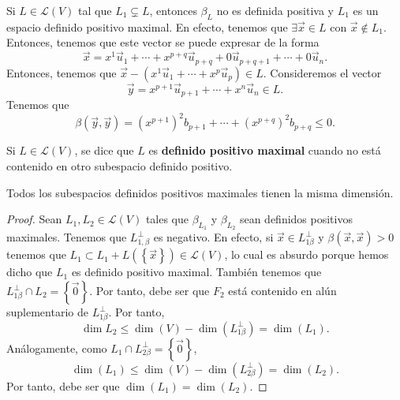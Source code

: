 \begin{observation}
\normalfont Si $\displaystyle L \in \mathcal{L}\left(V\right) $ tal que $\displaystyle L_{1} \subsetneq L $, entonces $\displaystyle \beta_{L} $ no es definida positiva y $\displaystyle L_{1} $ es un espacio definido positivo maximal. En efecto, tenemos que $\displaystyle \exists \vec{x} \in L $ con $\displaystyle \vec{x} \not\in L_{1} $. Entonces, tenemos que este vector se puede expresar de la forma
\[\vec{x} = x^{1}\vec{u}_{1} + \cdots + x^{p + q}\vec{u}_{p + q} + 0 \vec{u}_{p + q +1} + \cdots + 0\vec{u}_{n} .\]
Entonces, tenemos que $\displaystyle \vec{x}-\left(x^{1}\vec{u}_{1} + \cdots + x^{p}\vec{u}_{p}\right) \in L $. Consideremos el vector
\[ \vec{y} = x^{p +1}\vec{u}_{p +1} + \cdots + x^{n}\vec{u}_{n} \in L .\]
Tenemos que 
\[\beta\left(\vec{y},\vec{y}\right) = \left(x^{p + 1}\right)^{2}b_{p + 1} + \cdots + \left(x^{p + q}\right)^{2}b_{p + q} \leq 0 .\]
\end{observation}
\begin{fdefinition}[]
\normalfont Si $\displaystyle L \in \mathcal{L}\left(V\right) $, se dice que $\displaystyle L $ es \textbf{definido positivo maximal} cuando no está contenido en otro subespacio definido positivo.
\end{fdefinition}
\begin{ftheorem}[]
\normalfont Todos los subespacios definidos positivos maximales tienen la misma dimensión.
\end{ftheorem}
\begin{proof}
	Sean $\displaystyle L_{1}, L_{2} \in \mathcal{L}\left(V\right) $ tales que $\displaystyle \beta_{L_{1}} $ y $\displaystyle \beta_{L_{2}} $ sean definidos positivos maximales. Tenemos que $\displaystyle L^{\perp }_{1,\beta} $ es negativo. En efecto, si $\displaystyle \vec{x} \in L_{1\beta }^{\perp} $ y $\displaystyle \beta\left(\vec{x}, \vec{x}\right) > 0 $ tenemos que $\displaystyle L_{1} \subset L_{1} + L\left( \left\{ \vec{x}\right\} \right) \in \mathcal{L}\left(V\right) $, lo cual es absurdo porque hemos dicho que $\displaystyle L_{1} $ es definido positivo maximal. También tenemos que $\displaystyle L_{1\beta }^{\perp } \cap L_{2} = \left\{ \vec{0}\right\}  $. Por tanto, debe ser que $\displaystyle F_{2} $ está contenido en alún suplementario de $\displaystyle L^{\perp }_{1\beta} $. Por tanto,
	\[ \dim L_{2} \leq \dim\left(V\right)-\dim\left(L^{\perp }_{1\beta }\right) = \dim\left(L_{1}\right)  .\]
	Análogamente, como $\displaystyle L_{1} \cap L^{\perp }_{2\beta } = \left\{ \vec{0}\right\}  $,
	\[ \dim\left(L_{1}\right) \leq \dim\left(V\right) - \dim\left(L^{\perp }_{2\beta }\right) = \dim\left(L_{2}\right) .\]
Por tanto, debe ser que $\displaystyle \dim\left(L_{1}\right) = \dim\left(L_{2}\right) $.
\end{proof}
